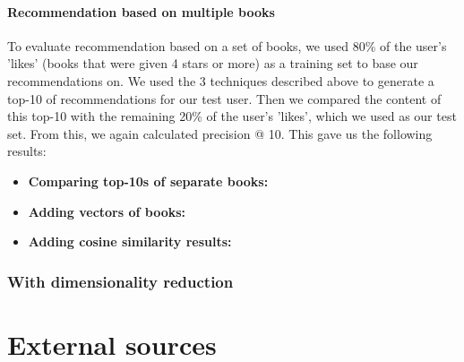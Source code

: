\documentclass[10pt,a4paper]{paper}
\begin{document}
\paragraph{Recommendation based on multiple books}
To evaluate recommendation based on a set of books, we used 80\% of the user's 'likes' (books that were given 4 stars or more) as a training set to base our recommendations on. We used the 3 techniques described above to generate a top-10 of recommendations for our test user. Then we compared the content of this top-10 with the remaining 20\% of the user's 'likes', which we used as our test set.
From this, we again calculated precision @ 10.
This gave us the following results:
\begin{itemize}
\item \textbf{Comparing top-10s of separate books:} %
\item \textbf{Adding vectors of books:}
\item \textbf{Adding cosine similarity results:}
\end{itemize}

\subsubsection{With dimensionality reduction}


\section{External sources}
\end{document}
